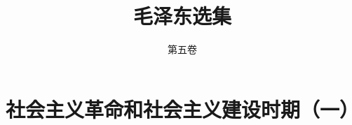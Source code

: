\documentclass[cn,11pt,chinese]{elegantbook}
\title{毛泽东选集}
\subtitle{第五卷}
\begin{document}
\maketitle
\frontmatter

\iffalse
\chapter*{特别声明}
\markboth{Introduction}{前言}

在过去的 2019 年，\href{https://elegantlatex.org/}{Elegant\LaTeX{}} 系列模板均逐步上线 \href{https://github.com/ElegantLaTeX}{GitHub}、\href{https://ctan.org/pkg/elegantbook}{CTAN}、\href{https://www.overleaf.com/latex/templates/elegantbook-template/zpsrbmdsxrgy}{Overleaf} 以及 \href{https://gitee.com/ElegantLaTeX/ElegantBook}{Gitee} 上。截止到 2019 年底，ElegantNote、ElegantBook、ElegantPaper 三个模板在 GitHub 上的收藏数达到了 194、333 和 220，从 2019 年 5 月开启捐赠之后收到了用户 33 笔合计超过 1500 元的捐赠，用户群人数也超过了 400 人。这些数字的背后，反映出 Elegant\LaTeX{} 越来越受用户的喜爱，在此非常感谢大家。

但是，我想声明的是：

\begin{center}
  由于某些原因，Elegant\LaTeX{} 项目 \underline{不再接受}\textbf{任何}非我本人预约的提交。
\end{center}

我是一个理想主义者，关于这个模板，我有自己的想法。我所关心的是，我周围的人能方便使用 \LaTeX{} 以及此模板，我自己会为自己的东西感到开心。如果维护模板让我不开心，那我就不会再维护了。诚然这个模板并不是完美的，但是相比 2.x 好很多了，这些改进离不开大家的反馈、China\TeX{} 和逐鹿人的鼓励以及支援人员的帮助！

\underline{如果你无法认同我的想法，建议直接删除本模板。}

\vskip 1.5cm

\begin{flushright}
Ethan Deng\\
February 10, 2020
\end{flushright}
\fi


\tableofcontents

\mainmatter





\chapter*{社会主义革命和社会主义建设时期（一）}\newpage
\end{document}
